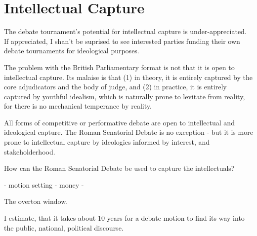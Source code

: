 \section{Intellectual Capture}

The debate tournament's potential for intellectual capture is under-appreciated. If appreciated, I shan't be suprised to see interested parties funding their own debate tournaments for ideological purposes.

The problem with the British Parliamentary format is not that it is open to intellectual capture. Its malaise is that (1) in theory, it is entirely captured by the core adjudicators and the body of judge, and (2) in practice, it is entirely captured by youthful idealism, which is naturally prone to levitate from reality, for there is no mechanical temperance by reality. 

All forms of competitive or performative debate are open to intellectual and ideological capture. The Roman Senatorial Debate is no exception - but it is more prone to intellectual capture by ideologies informed by interest, and stakeholderhood. 


How can the Roman Senatorial Debate be used to capture the intellectuals?

- motion setting 
- money 
- 


The overton window. 

I estimate, that it takes about 10 years for a debate motion to find its way into the public, national, political discourse. 